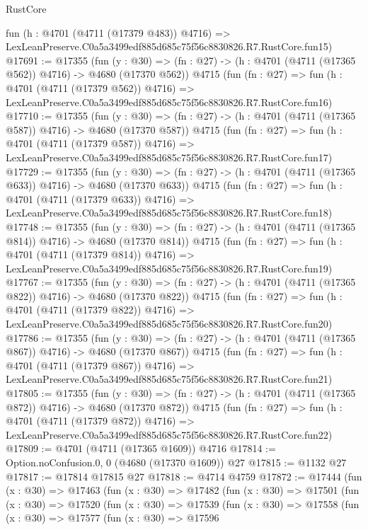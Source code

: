 \begin{lexlean}{RustCore}
\begin{coremodule}
    fun (h : @4701 (@4711 (@17379 @483)) @4716) =>
    LexLeanPreserve.C0a5a3499edf885d685c75f56c8830826.R7.RustCore.fun15)
@17691 := @17355
    (fun (y : @30) => (fn : @27) -> (h : @4701 (@4711 (@17365 @562)) @4716) -> @4680 (@17370 @562))
    @4715
    (fun (fn : @27) =>
    fun (h : @4701 (@4711 (@17379 @562)) @4716) =>
    LexLeanPreserve.C0a5a3499edf885d685c75f56c8830826.R7.RustCore.fun16)
@17710 := @17355
    (fun (y : @30) => (fn : @27) -> (h : @4701 (@4711 (@17365 @587)) @4716) -> @4680 (@17370 @587))
    @4715
    (fun (fn : @27) =>
    fun (h : @4701 (@4711 (@17379 @587)) @4716) =>
    LexLeanPreserve.C0a5a3499edf885d685c75f56c8830826.R7.RustCore.fun17)
@17729 := @17355
    (fun (y : @30) => (fn : @27) -> (h : @4701 (@4711 (@17365 @633)) @4716) -> @4680 (@17370 @633))
    @4715
    (fun (fn : @27) =>
    fun (h : @4701 (@4711 (@17379 @633)) @4716) =>
    LexLeanPreserve.C0a5a3499edf885d685c75f56c8830826.R7.RustCore.fun18)
@17748 := @17355
    (fun (y : @30) => (fn : @27) -> (h : @4701 (@4711 (@17365 @814)) @4716) -> @4680 (@17370 @814))
    @4715
    (fun (fn : @27) =>
    fun (h : @4701 (@4711 (@17379 @814)) @4716) =>
    LexLeanPreserve.C0a5a3499edf885d685c75f56c8830826.R7.RustCore.fun19)
@17767 := @17355
    (fun (y : @30) => (fn : @27) -> (h : @4701 (@4711 (@17365 @822)) @4716) -> @4680 (@17370 @822))
    @4715
    (fun (fn : @27) =>
    fun (h : @4701 (@4711 (@17379 @822)) @4716) =>
    LexLeanPreserve.C0a5a3499edf885d685c75f56c8830826.R7.RustCore.fun20)
@17786 := @17355
    (fun (y : @30) => (fn : @27) -> (h : @4701 (@4711 (@17365 @867)) @4716) -> @4680 (@17370 @867))
    @4715
    (fun (fn : @27) =>
    fun (h : @4701 (@4711 (@17379 @867)) @4716) =>
    LexLeanPreserve.C0a5a3499edf885d685c75f56c8830826.R7.RustCore.fun21)
@17805 := @17355
    (fun (y : @30) => (fn : @27) -> (h : @4701 (@4711 (@17365 @872)) @4716) -> @4680 (@17370 @872))
    @4715
    (fun (fn : @27) =>
    fun (h : @4701 (@4711 (@17379 @872)) @4716) =>
    LexLeanPreserve.C0a5a3499edf885d685c75f56c8830826.R7.RustCore.fun22)
@17809 := @4701 (@4711 (@17365 @1609)) @4716
@17814 := Option.noConfusion.{0, 0} (@4680 (@17370 @1609)) @27
@17815 := @1132 @27
@17817 := @17814 @17815 @27
@17818 := @4714 @4759
@17872 := @17444
    (fun (x : @30) =>
    @17463
      (fun (x : @30) =>
      @17482
        (fun (x : @30) =>
        @17501
          (fun (x : @30) =>
          @17520
            (fun (x : @30) =>
            @17539
              (fun (x : @30) =>
              @17558
                (fun (x : @30) =>
                @17577
                  (fun (x : @30) =>
                  @17596

\end{coremodule}
\end{lexlean}
